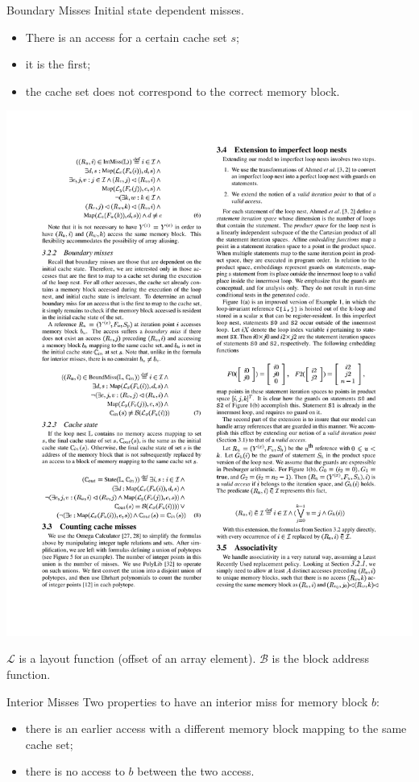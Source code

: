 \documentclass{beamer}
\begin{document}
\begin{frame}{Boundary Misses}
  Initial state dependent misses.
  \begin{itemize}[<+->]
    \item There is an access for a certain cache set $s$;
    \item it is the first;
    \item the cache set does not correspond to the correct memory block.
  \end{itemize}
  \begin{center}
    \includegraphics[scale=1.1]{eq7}
  \end{center}
  $\mathcal{L}$ is a layout function (offset of an array element).
  $\mathcal{B}$ is the block address function.
\end{frame}

\begin{frame}{Interior Misses}
  Two properties to have an interior miss for memory block $b$:
  \begin{itemize}
    \item there is an earlier access with a different memory block mapping to the same cache set;
    \item there is no access to $b$ between the two access.
  \end{itemize}
\end{frame}
\end{document}
